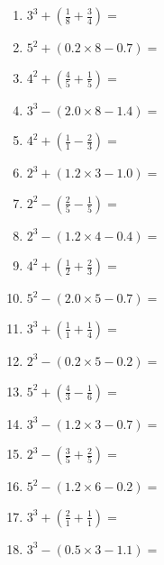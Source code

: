 \documentclass[12pt]{article}
\begin{document}
\begin{enumerate}
\item \large $ 3^{3} + (\frac{1}{8} + \frac{3}{4}) = $ \vspace{1.6cm}
\item \large $ 5^{2} + (0.2 \times 8 - 0.7) = $ \vspace{1.6cm}
\item \large $ 4^{2} + (\frac{4}{5} + \frac{1}{5}) = $ \vspace{1.6cm}
\item \large $ 3^{3} - (2.0 \times 8 - 1.4) = $ \vspace{1.6cm}
\newpage
\item \large $ 4^{2} + (\frac{1}{1} - \frac{2}{3}) = $ \vspace{1.6cm}
\item \large $ 2^{3} + (1.2 \times 3 - 1.0) = $ \vspace{1.6cm}
\item \large $ 2^{2} - (\frac{2}{5} - \frac{1}{5}) = $ \vspace{1.6cm}
\item \large $ 2^{3} - (1.2 \times 4 - 0.4) = $ \vspace{1.6cm}
\item \large $ 4^{2} + (\frac{1}{2} + \frac{2}{3}) = $ \vspace{1.6cm}
\item \large $ 5^{2} - (2.0 \times 5 - 0.7) = $ \vspace{1.6cm}
\item \large $ 3^{3} + (\frac{1}{1} + \frac{1}{4}) = $ \vspace{1.6cm}
\item \large $ 2^{3} - (0.2 \times 5 - 0.2) = $ \vspace{1.6cm}
\item \large $ 5^{2} + (\frac{4}{3} - \frac{1}{6}) = $ \vspace{1.6cm}
\item \large $ 3^{3} - (1.2 \times 3 - 0.7) = $ \vspace{1.6cm}
\newpage
\item \large $ 2^{3} - (\frac{3}{5} + \frac{2}{5}) = $ \vspace{1.6cm}
\item \large $ 5^{2} - (1.2 \times 6 - 0.2) = $ \vspace{1.6cm}
\item \large $ 3^{3} + (\frac{2}{1} + \frac{1}{1}) = $ \vspace{1.6cm}
\item \large $ 3^{3} - (0.5 \times 3 - 1.1) = $ \vspace{1.6cm}

\end{enumerate}
\end{document}
